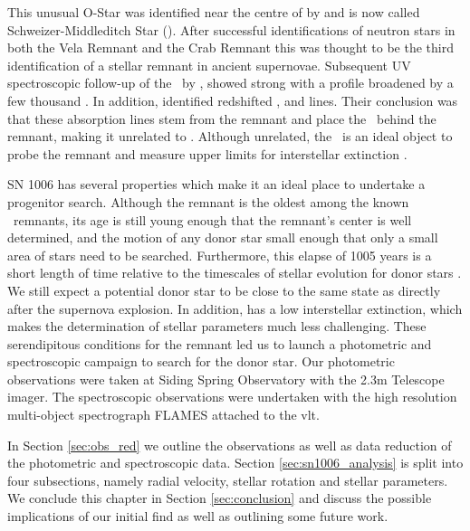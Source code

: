 This unusual O-Star was identified near the centre of  by \citet{1980ApJ...241.1039S} and is now called Schweizer-Middleditch Star (\smstar). After successful identifications of neutron stars in both the Vela Remnant and the Crab Remnant this was thought to be the third identification of a stellar remnant in ancient supernovae. Subsequent UV spectroscopic follow-up of the \smstar\ by \citet{1983ApJ...269L...5W} , showed strong   with a profile broadened by a few thousand \kms. In addition, \citet{1983ApJ...269L...5W} identified redshifted ,  and  lines. Their conclusion was that these absorption lines stem from the remnant and place the \smstar\ behind the remnant, making it unrelated to . Although unrelated, the \smstar\ is an ideal object to probe the remnant and measure upper limits for interstellar extinction \citep[E(B-V) = 0.1][]{1993ApJ...416..247W,2003ApJ...585..324W}.


SN 1006 has several properties which make it an ideal place to undertake a progenitor search.  Although the remnant is the oldest among the known \snia\ remnants, its age is still young enough that  the remnant's center is well determined, and the motion of any donor star small enough that only a small area of stars need to be searched. Furthermore, this elapse of 1005 years is a short length of time relative to the timescales of stellar evolution for donor stars \cite[see][]{2000ApJS..128..615M}. We still expect a potential donor star to be close to the same state as directly after the supernova explosion. In addition,  has a low interstellar extinction, which makes the determination of stellar parameters much less challenging. These serendipitous conditions for the  remnant led us to launch a photometric and spectroscopic campaign to search for the donor star. Our photometric observations were taken at Siding Spring Observatory with the 2.3m Telescope imager. The spectroscopic observations were undertaken with the high resolution multi-object spectrograph FLAMES attached to the \gls{vlt}.


In Section \ref{sec:obs_red} we outline the observations as well as data reduction of the photometric and spectroscopic data. Section \ref{sec:sn1006_analysis} is split into four subsections, namely radial velocity, stellar rotation and stellar parameters. We conclude this chapter in Section \ref{sec:conclusion} and discuss the possible implications of our initial find as well as outlining some future work.


